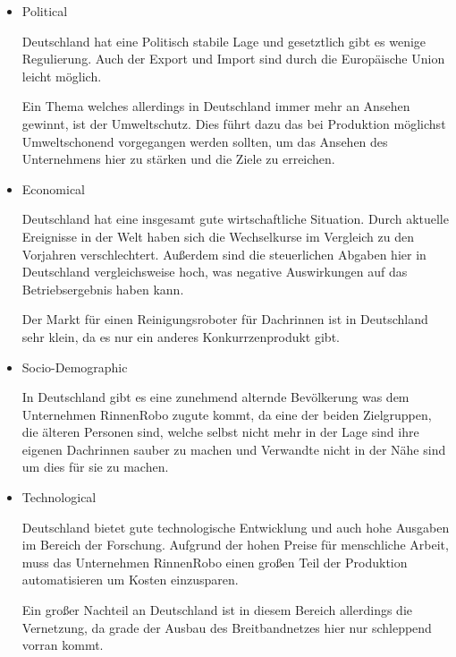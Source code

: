             \begin{itemize}
                \item Political
                
                    Deutschland hat eine Politisch stabile Lage und gesetztlich gibt es wenige Regulierung. Auch der Export
                    und Import sind durch die Europäische Union leicht möglich.
    
                    Ein Thema welches allerdings in Deutschland immer mehr an Ansehen gewinnt, ist der Umweltschutz. Dies 
                    führt dazu das bei Produktion möglichst Umweltschonend vorgegangen werden sollten, um das Ansehen des
                    Unternehmens hier zu stärken und die Ziele zu erreichen.
    
                \item Economical
                
                    Deutschland hat eine insgesamt gute wirtschaftliche Situation. Durch aktuelle Ereignisse in der Welt 
                    haben sich die Wechselkurse im Vergleich zu den Vorjahren verschlechtert. Außerdem sind die steuerlichen 
                    Abgaben hier in Deutschland vergleichsweise hoch, was negative Auswirkungen auf das Betriebsergebnis
                    haben kann.
    
                    Der Markt für einen Reinigungsroboter für Dachrinnen ist in Deutschland sehr klein, da es nur ein 
                    anderes Konkurrzenprodukt gibt.
    
                \item Socio-Demographic
                
                    In Deutschland gibt es eine zunehmend alternde Bevölkerung was dem Unternehmen RinnenRobo
                    zugute kommt, da eine der beiden Zielgruppen, die älteren Personen sind, welche selbst nicht mehr in
                    der Lage sind ihre eigenen Dachrinnen sauber zu machen und Verwandte nicht in der Nähe sind um dies
                    für sie zu machen.
    
                \item Technological
                
                    Deutschland bietet gute technologische Entwicklung und auch hohe Ausgaben im Bereich der Forschung. 
                    Aufgrund der hohen Preise für menschliche Arbeit, muss das Unternehmen RinnenRobo einen großen Teil 
                    der Produktion automatisieren um Kosten einzusparen.
    
                    Ein großer Nachteil an Deutschland ist in diesem Bereich allerdings die Vernetzung, da grade der Ausbau
                    des Breitbandnetzes hier nur schleppend vorran kommt.
            \end{itemize}

